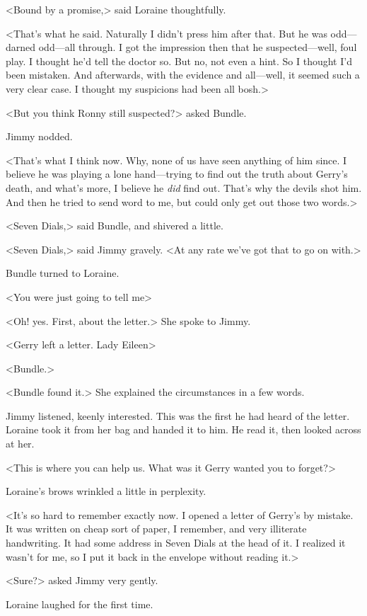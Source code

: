 <Bound by a promise,> said Loraine thoughtfully.

<That's what he said. Naturally I didn't press him after that. But he was odd—darned odd—all through. I got the impression then that he suspected—well, foul play. I thought he'd tell the doctor so. But no, not even a hint. So I thought I'd been mistaken. And afterwards, with the evidence and all—well, it seemed such a very clear case. I thought my suspicions had been all bosh.>

<But you think Ronny still suspected?> asked Bundle.

Jimmy nodded.

<That's what I think now. Why, none of us have seen anything of him since. I believe he was playing a lone hand—trying to find out the truth about Gerry's death, and what's more, I believe he \emph{did} find out. That's why the devils shot him. And then he tried to send word to me, but could only get out those two words.>

<Seven Dials,> said Bundle, and shivered a little.

<Seven Dials,> said Jimmy gravely. <At any rate we've got that to go on with.>

Bundle turned to Loraine.

<You were just going to tell me\longdash>

<Oh! yes. First, about the letter.> She spoke to Jimmy.

<Gerry left a letter. Lady Eileen\longdash>

<Bundle.>

<Bundle found it.> She explained the circumstances in a few words.

Jimmy listened, keenly interested. This was the first he had heard of the letter. Loraine took it from her bag and handed it to him. He read it, then looked across at her.

<This is where you can help us. What was it Gerry wanted you to forget?>

Loraine's brows wrinkled a little in perplexity.

<It's so hard to remember exactly now. I opened a letter of Gerry's by mistake. It was written on cheap sort of paper, I remember, and very illiterate handwriting. It had some address in Seven Dials at the head of it. I realized it wasn't for me, so I put it back in the envelope without reading it.>

<Sure?> asked Jimmy very gently.

Loraine laughed for the first time.

